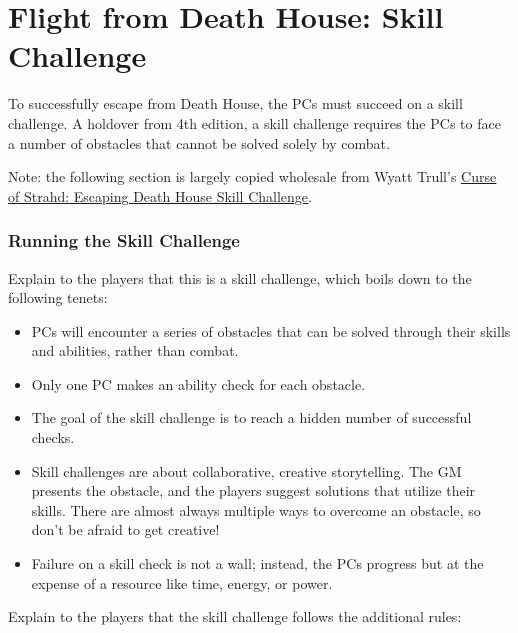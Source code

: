 \pagebreak
\section*{Flight from Death House: Skill Challenge}
\label{sec:SkillChallenge}
To successfully escape from Death House, the PCs must succeed on a skill challenge. A holdover from 4th edition,
a skill challenge requires the PCs to face a number of obstacles that cannot be solved solely by combat.

Note: the following section is largely copied wholesale from Wyatt Trull's
\href{https://www.dmsguild.com/product/248157/Curse-of-Strahd-Escaping-Death-House-Skill-Challenge}{
\uline{Curse of Strahd: Escaping Death House Skill Challenge}}.

\subsubsection*{Running the Skill Challenge}
Explain to the players that this is a skill challenge, which boils down to the following tenets:
\begin{itemize}
  \item PCs will encounter a series of obstacles that can be solved through their skills and abilities, rather
  than combat.
  \item Only one PC makes an ability check for each obstacle.
  \item The goal of the skill challenge is to reach a hidden number of successful checks.
  \item Skill challenges are about collaborative, creative storytelling. The GM presents the obstacle, and the
  players suggest solutions that utilize their skills. There are almost always multiple ways to overcome an
  obstacle, so don't be afraid to get creative!
  \item Failure on a skill check is not a wall; instead, the PCs progress but at the expense of a resource like
  time, energy, or power.
\end{itemize}
Explain to the players that the skill challenge follows the additional rules:
